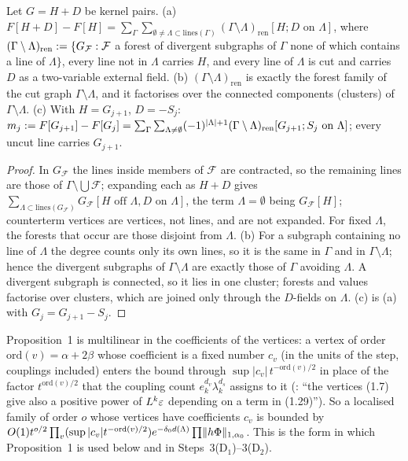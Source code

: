 \begin{lemma}\label{lem:a06e:MC}
Let $G=H+D$ be kernel pairs. \textup{(a)} $F[H+D]-F[H]=\sum_\Gamma\sum_{\emptyset\ne\Lambda\subset\mathrm{lines}(\Gamma)}(\Gamma\setminus\Lambda)_{\mathrm{ren}}[H;D\text{ on }\Lambda]$, where $(\Gamma\setminus\Lambda)_{\mathrm{ren}}:=\{G_{\mathcal F}:\mathcal F$ a forest of divergent subgraphs of $\Gamma$ none of which contains a line of $\Lambda\}$, every line not in $\Lambda$ carries $H$, and every line of $\Lambda$ is cut and carries $D$ as a two-variable external field. \textup{(b)} $(\Gamma\setminus\Lambda)_{\mathrm{ren}}$ is exactly the forest family of the cut graph $\Gamma\setminus\Lambda$, and it factorises over the connected components (clusters) of $\Gamma\setminus\Lambda$. \textup{(c)} With $H=G_{j+1}$, $D=-S_j$: $m_j:= F[G_{j+1}]-F[G_j]=\sum_\Gamma\sum_{\Lambda\ne\emptyset}(-1)^{|\Lambda|+1}(\Gamma\setminus\Lambda)_{\mathrm{ren}}[G_{j+1};S_j\text{ on }\Lambda]$; every uncut line carries $G_{j+1}$.
\end{lemma}

\begin{proof}
In $G_{\mathcal F}$ the lines inside members of $\mathcal F$ are contracted, so the remaining lines are those of $\Gamma\setminus\bigcup\mathcal F$; expanding each as $H+D$ gives $\sum_{\Lambda\subset\mathrm{lines}(G_{\mathcal F})}G_{\mathcal F}[H\text{ off }\Lambda,D\text{ on }\Lambda]$, the term $\Lambda=\emptyset$ being $G_{\mathcal F}[H]$; counterterm vertices are vertices, not lines, and are not expanded. For fixed $\Lambda$, the forests that occur are those disjoint from $\Lambda$. (b) For a subgraph containing no line of $\Lambda$ the degree counts only its own lines, so it is the same in $\Gamma$ and in $\Gamma\setminus\Lambda$; hence the divergent subgraphs of $\Gamma\setminus\Lambda$ are exactly those of $\Gamma$ avoiding $\Lambda$. A divergent subgraph is connected, so it lies in one cluster; forests and values factorise over clusters, which are joined only through the $D$-fields on $\Lambda$. (c) is (a) with $G_j=G_{j+1}-S_j$.
\end{proof}

Proposition~1 is multilinear in the coefficients of the \cite[(1.7)]{Ba3} vertices: a \cite[(1.7)]{Ba3} vertex of order $\mathrm{ord}(v)=\alpha+2\beta$ whose coefficient is a fixed number $c_v$ (in the units of the step, couplings included) enters the bound \cite[(1.33)]{Ba3} through $\sup|c_v|\,t^{-\mathrm{ord}(v)/2}$ in place of the factor $t^{\mathrm{ord}(v)/2}$ that the coupling count $e_k^{d_v}\lambda_k^{d_s}$ assigns to it (\cite[p.~421]{Ba3}: ``the vertices (1.7) give also a positive power of $L^k\varepsilon$ depending on a term in (1.29)''). So a localised family of order $o$ whose \cite[(1.7)]{Ba3} vertices have coefficients $c_v$ is bounded by $O(1)t^{o/2}\prod_v(\sup|c_v|t^{-\mathrm{ord}(v)/2})e^{-\delta_0d(\Lambda)}\prod\lVert h\Phi\rVert_{1,\alpha_0}$. This is the form in which Proposition~1 is used below and in Steps~3(D$_1$)--3(D$_2$).

